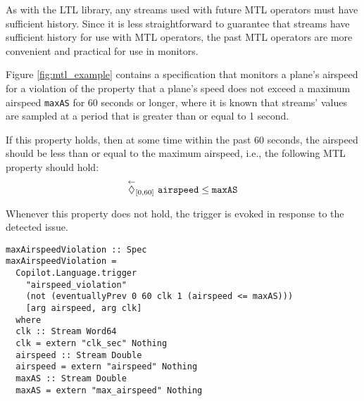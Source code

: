 As with the LTL library, any streams used with future MTL operators must
have sufficient history. Since it is less straightforward to guarantee
that streams have sufficient history for use with MTL operators, the past
MTL operators are more convenient and practical for use in monitors.

Figure \ref{fig:mtl_example} contains a specification that monitors a plane's airspeed for a
violation of the property that a plane's speed does not exceed a maximum
airspeed \verb,maxAS, for 60 seconds or longer, where it is known that streams'
values are sampled at a period that is greater than or equal to 1 second.

If this property holds, then at some time within the past 60 seconds,
the airspeed should be less than or equal to the maximum airspeed, i.e.,
the following MTL property should hold:
$$ \overset{\leftarrow}{\lozenge}_{[0,60]}~\mathtt{airspeed} \leq \mathtt{maxAS} $$

Whenever this property does not hold, the trigger is evoked in response to
the detected issue.

\begin{figure*}[!htb]
\begin{lstlisting}[frame=none]
maxAirspeedViolation :: Spec
maxAirspeedViolation =
  Copilot.Language.trigger
    "airspeed_violation"
    (not (eventuallyPrev 0 60 clk 1 (airspeed <= maxAS)))
    [arg airspeed, arg clk]
  where
  clk :: Stream Word64
  clk = extern "clk_sec" Nothing
  airspeed :: Stream Double
  airspeed = extern "airspeed" Nothing
  maxAS :: Stream Double
  maxAS = extern "max_airspeed" Nothing
\end{lstlisting}
\caption{An example use of the MTL library.}
\label{fig:mtl_example}
\end{figure*}
